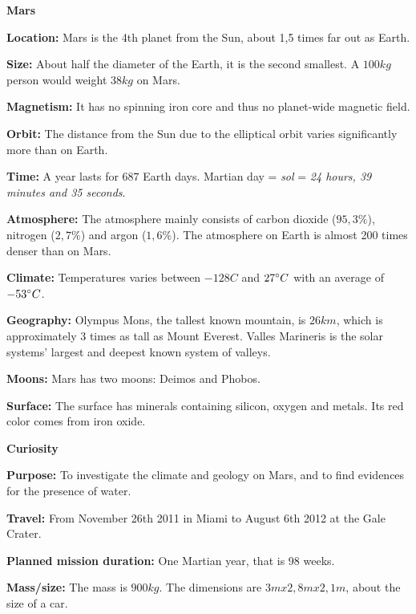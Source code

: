 \begin{tcolorbox}[colback=red!5,colframe=DarkRed!40!black,title=Mars \& Curiosity: The Red Planet and the rover]

\textbf{\large{Mars}\cite{NASA-rover}}

\textbf{Location:} Mars is the 4th planet from the Sun, about 1,5 times far out as Earth.

\textbf{Size:} About half the diameter of the Earth, it is the second smallest.
A $100 kg$ person would weight $38 kg$ on Mars.

\textbf{Magnetism:} It has no spinning iron core and thus no planet-wide magnetic field.

\textbf{Orbit:} The distance from the Sun due to the elliptical orbit varies significantly more than on Earth.

\textbf{Time:} A year lasts for $687$ Earth days.
Martian day = \textit{sol} = \textit{24 hours, 39 minutes and 35 seconds}.

\textbf{Atmosphere:} The atmosphere mainly consists of carbon dioxide ($95,3 \%$), nitrogen ($2,7 \%$) and argon ($1,6\%$).
The atmosphere on Earth is almost 200 times denser than on Mars.

\textbf{Climate:} Temperatures varies between $-128C$ and $27 \degree C$ with an average of $-53 \degree C$.

\textbf{Geography:} Olympus Mons, the tallest known mountain, is $26 km$, which is approximately 3 times as tall as Mount Everest.
Valles Marineris is the solar systems' largest and deepest known system of valleys.

\textbf{Moons:} Mars has two moons: Deimos and Phobos.

\textbf{Surface:} The surface has minerals containing silicon, oxygen and metals.
Its red color comes from iron oxide.

\noindent\makebox[\linewidth]{\rule{\textwidth}{0.4pt}}
\vspace{0mm}

\textbf{\large{Curiosity}}

\textbf{Purpose:} To investigate the climate and geology on Mars, and to find evidences for the presence of water.

\textbf{Travel:} From November 26th 2011 in Miami to August 6th 2012 at the Gale Crater.

\textbf{Planned mission duration:} One Martian year, that is 98 weeks.

\textbf{Mass/size:} The mass is $900 kg$.
The dimensions are $3 m x 2,8 m x 2,1 m$, about the size of a car.


\end{tcolorbox}

